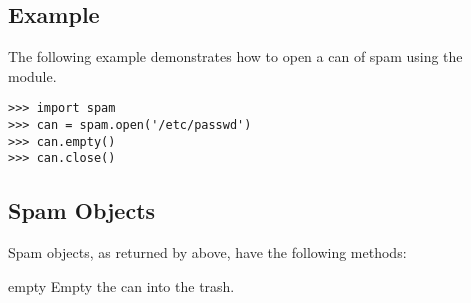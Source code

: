 %



\subsection{Example}

The following example demonstrates how to open a can of spam using the
 module.

\begin{verbatim}
>>> import spam
>>> can = spam.open('/etc/passwd')
>>> can.empty()
>>> can.close()
\end{verbatim}


\subsection{Spam Objects}
\label{spam-objects}

Spam objects, as returned by  above, have the
following methods:

\begin{methoddesc}[spam]{empty}{}
Empty the can into the trash.
\end{methoddesc}

